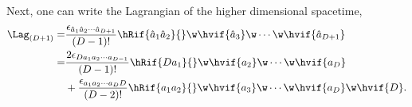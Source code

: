 Next, one can write the Lagrangian of the higher dimensional spacetime,
\begin{align}
  \Lag_{(D+1)} =& \frac{\epsilon_{\hat{a}_1\hat{a}_2\cdots\hat{a}_{D+1}}}{(D-1)!}\hRif{\hat{a}_1\hat{a}_2}{}\w\hvif{\hat{a}_3}\w\cdots\w\hvif{\hat{a}_{D+1}}\\
  =& \frac{2 \epsilon_{D a_1 a_2\cdots a_{D-1}}}{(D-1)!}\hRif{D{a}_1}{}\w\hvif{{a}_2}\w\cdots\w\hvif{{a}_{D}}\notag\\
  &+ \frac{\epsilon_{a_1 a_2\cdots a_{D}D}}{(D-2)!}\hRif{{a}_1{a}_2}{}\w\hvif{{a}_3}\w\cdots\w\hvif{{a}_{D}}\w\hvif{D}.
\end{align}
